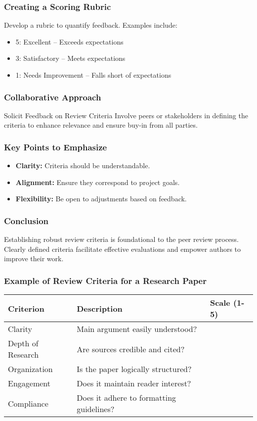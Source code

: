 \documentclass{beamer}
\begin{document}
\begin{frame}[fragile]
    \frametitle{Creating a Scoring Rubric}
    Develop a rubric to quantify feedback. Examples include:
    \begin{itemize}
        \item 5: Excellent – Exceeds expectations
        \item 3: Satisfactory – Meets expectations
        \item 1: Needs Improvement – Falls short of expectations
    \end{itemize}
\end{frame}

\begin{frame}[fragile]
    \frametitle{Collaborative Approach}
    \begin{block}{Solicit Feedback on Review Criteria}
        Involve peers or stakeholders in defining the criteria to enhance relevance and ensure buy-in from all parties.
    \end{block}
\end{frame}

\begin{frame}[fragile]
    \frametitle{Key Points to Emphasize}
    \begin{itemize}
        \item \textbf{Clarity:} Criteria should be understandable.
        \item \textbf{Alignment:} Ensure they correspond to project goals.
        \item \textbf{Flexibility:} Be open to adjustments based on feedback.
    \end{itemize}
\end{frame}

\begin{frame}[fragile]
    \frametitle{Conclusion}
    Establishing robust review criteria is foundational to the peer review process. Clearly defined criteria facilitate effective evaluations and empower authors to improve their work.
\end{frame}

\begin{frame}[fragile]
    \frametitle{Example of Review Criteria for a Research Paper}
    \begin{tabular}{|l|l|l|}
        \hline
        \textbf{Criterion} & \textbf{Description} & \textbf{Scale (1-5)} \\
        \hline
        Clarity & Main argument easily understood? & \\
        \hline
        Depth of Research & Are sources credible and cited? & \\
        \hline
        Organization & Is the paper logically structured? & \\
        \hline
        Engagement & Does it maintain reader interest? & \\
        \hline
        Compliance & Does it adhere to formatting guidelines? & \\
        \hline
    \end{tabular}
\end{frame}
\end{document}
